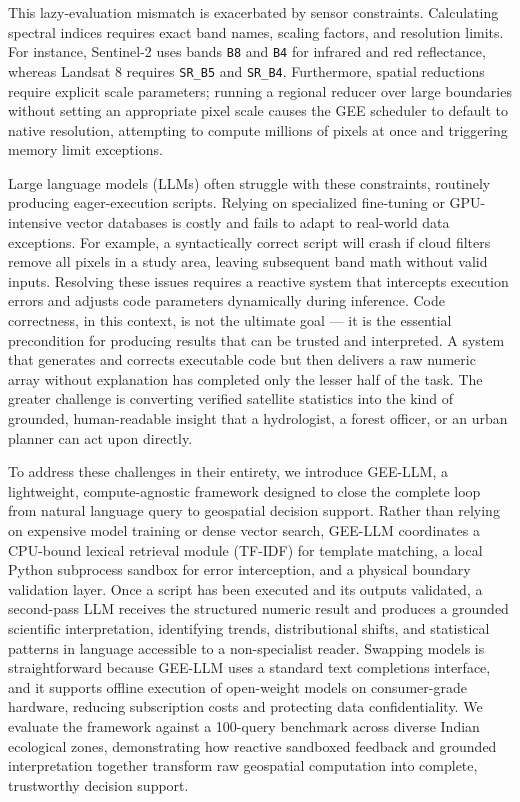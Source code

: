 \documentclass[pdflatex,sn-mathphys-ay]{sn-jnl}
\begin{document}
This lazy-evaluation mismatch is exacerbated by sensor constraints. Calculating spectral indices requires exact band names, scaling factors, and resolution limits. For instance, Sentinel-2 uses bands \texttt{B8} and \texttt{B4} for infrared and red reflectance, whereas Landsat 8 requires \texttt{SR\_B5} and \texttt{SR\_B4}. Furthermore, spatial reductions require explicit scale parameters; running a regional reducer over large boundaries without setting an appropriate pixel scale causes the GEE scheduler to default to native resolution, attempting to compute millions of pixels at once and triggering memory limit exceptions.

Large language models (LLMs) often struggle with these constraints, routinely producing eager-execution scripts. Relying on specialized fine-tuning or GPU-intensive vector databases is costly and fails to adapt to real-world data exceptions. For example, a syntactically correct script will crash if cloud filters remove all pixels in a study area, leaving subsequent band math without valid inputs. Resolving these issues requires a reactive system that intercepts execution errors and adjusts code parameters dynamically during inference. Code correctness, in this context, is not the ultimate goal --- it is the essential precondition for producing results that can be trusted and interpreted. A system that generates and corrects executable code but then delivers a raw numeric array without explanation has completed only the lesser half of the task. The greater challenge is converting verified satellite statistics into the kind of grounded, human-readable insight that a hydrologist, a forest officer, or an urban planner can act upon directly.

To address these challenges in their entirety, we introduce GEE-LLM, a lightweight, compute-agnostic framework designed to close the complete loop from natural language query to geospatial decision support. Rather than relying on expensive model training or dense vector search, GEE-LLM coordinates a CPU-bound lexical retrieval module (TF-IDF) for template matching, a local Python subprocess sandbox for error interception, and a physical boundary validation layer. Once a script has been executed and its outputs validated, a second-pass LLM receives the structured numeric result and produces a grounded scientific interpretation, identifying trends, distributional shifts, and statistical patterns in language accessible to a non-specialist reader. Swapping models is straightforward because GEE-LLM uses a standard text completions interface, and it supports offline execution of open-weight models on consumer-grade hardware, reducing subscription costs and protecting data confidentiality. We evaluate the framework against a 100-query benchmark across diverse Indian ecological zones, demonstrating how reactive sandboxed feedback and grounded interpretation together transform raw geospatial computation into complete, trustworthy decision support.
\end{document}
